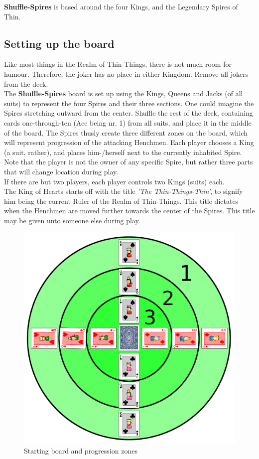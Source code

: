 \documentclass[11pt,twocolumn]{article}
\begin{document}
\textbf{Shuffle-Spires} is based around the four Kings, and the Legendary Spires of Thin.

\subsection{Setting up the board}
Like most things in the Realm of Thin-Things, there is not much room for humour. Therefore, the joker has no place in either Kingdom. Remove all jokers from the deck.\\

\noindent
The \textbf{Shuffle-Spires} board is set up using the Kings, Queens and Jacks (of all suits) to represent the four Spires and their three sections. One could imagine the Spires stretching outward from the center. Shuffle the rest of the deck, containing cards one-through-ten (Ace being nr. 1) from all suits, and place it in the middle of the board.
The Spires thusly create three different zones on the board, which will represent progression of the attacking Henchmen.
Each player chooses a King (a suit, rather), and places him-/herself next to the currently inhabited Spire. Note that the player is not the owner of any specific Spire, but rather three parts that will change location during play. \\
If there are but two players, each player controls two Kings (suits) each. \\

\noindent
The King of Hearts starts off with the title \textit{'The Thin-Things-Thin'}, to signify him being the current Ruler of the Realm of Thin-Things. This title dictates when the Henchmen are moved further towards the center of the Spires. This title may be given unto someone else during play.

\begin{figure}[h!]
\centering
\includegraphics[scale=0.08]{starting.png}
\caption{Starting board and progression zones}
\label{starting}
\end{figure}
\end{document}
